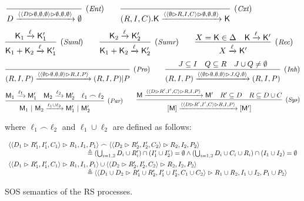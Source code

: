 \begin{figure*}[t]
		$$  
		\infer[(\textit{\scriptsize{Ent}})]
		{D \xrightarrow{\obs{\obs{D}{\emptyset,\emptyset,\emptyset}}{\emptyset,\emptyset,\emptyset}}\emptyset}
		{}
		\qquad
		\infer[(\textit{\scriptsize{Cxt}})]
		{(R,I,C).\mathsf{K} \xrightarrow{\obs{\obs{\emptyset}{R,I,C}}{\emptyset,\emptyset,\emptyset}}\mathsf{K}}{}
		$$
		$$
		\infer[(\textit{\scriptsize Suml})]
		{\mathsf{K}_1 + \mathsf{K}_2 \xrightarrow{\ell}\mathsf{K}'_1}
		{\mathsf{K}_1 \xrightarrow{\ell}\mathsf{K}'_1}
		\qquad
		\infer[(\textit{\scriptsize Sumr})]
		{\mathsf{K}_1 + \mathsf{K}_2 \xrightarrow{\ell}\mathsf{K}'_2}
		{\mathsf{K}_2 \xrightarrow{\ell}\mathsf{K}'_2}
		\qquad
		\infer[(\textit{\scriptsize Rec})]
		{X \xrightarrow{\ell}\mathsf{K}'}
		{X=\mathsf{K}\in\Delta & \mathsf{K} \xrightarrow{\ell}\mathsf{K}'}
		$$
		$$
		\infer[(\textit{\scriptsize Pro})]
		{(R,I,P)  \xrightarrow{\obs{\obs{\emptyset}{\emptyset,\emptyset,\emptyset}}{R,I,P}}(R,I,P)|P}
		{}
		\qquad
		\infer[(\textit{\scriptsize Inh})]
		{(R,I,P)  \xrightarrow{\obs{\obs{\emptyset}{\emptyset,\emptyset,\emptyset}}{J,Q,\emptyset}}(R,I,P)}
		{J \subseteq I & Q \subseteq R & J\cup Q\neq \emptyset}
		$$
		$$
		\infer[(\textit{\scriptsize Par})]
		{\mathsf{M}_1~|~\mathsf{M}_2\xrightarrow{\ell_1\cup\ell_2} \mathsf{M}'_1~|~\mathsf{M}'_2}
		{\mathsf{M}_1 \xrightarrow{\ell_1} \mathsf{M}'_1 &
		\mathsf{M}_2 \xrightarrow{\ell_2} \mathsf{M}'_2 &
			\ell_1\frown \ell_2 }
		\qquad
		\infer[(\textit{\scriptsize Sys})]
		{[\mathsf{M}]\xrightarrow{\obs{\obs{D}{R',I',C}}{R,I,P}} [\mathsf{M}']}
		{\mathsf{M}\xrightarrow{\obs{\obs{D}{R',I',C}}{R,I,P}} \mathsf{M}' &
		R'\subseteq D &
        R\subseteq D\cup C}
		$$
		
\noindent
		where $\ell_1 \frown \ell_2$ and $\ell_1 \cup \ell_2$ are defined as follows:
		
		$$\begin{array}{l}
\langle \langle D_1\vartriangleright R'_1,I'_1,C_1\rangle\vartriangleright R_1,I_1,P_1\rangle
\frown
\langle \langle D_2\vartriangleright R'_2,I'_2,C_2\rangle\vartriangleright R_2,I_2,P_2\rangle
\\
\qquad\qquad\qquad\qquad\qquad\qquad
\triangleq (\textstyle\bigcup_{i=1,2} D_i\cup  R'_i) \cap (I'_1 \cup I'_2) = \emptyset
\wedge
(\bigcup_{i=1,2} D_i\cup  C_i\cup  R_i) \cap (I_1 \cup I_2) = \emptyset \\[5pt]
\langle \langle D_1\vartriangleright R'_1,I'_1,C_1\rangle\vartriangleright R_1,I_1,P_1\rangle
\cup
\langle \langle D_2\vartriangleright R'_2,I'_2,C_2\rangle\vartriangleright R_2,I_2,P_2\rangle
\\
\qquad\qquad\qquad\qquad\qquad\qquad
\triangleq \langle \langle D_1\cup D_2\vartriangleright R'_1\cup R'_2,I'_1\cup I'_2,C_1\cup C_2\rangle\vartriangleright R_1\cup R_2,I_1\cup I_2,P_1\cup P_2\rangle
\end{array}$$
		\caption{SOS semantics of the RS processes.}
		\label{fig:guardforRS2nd}
\end{figure*}


